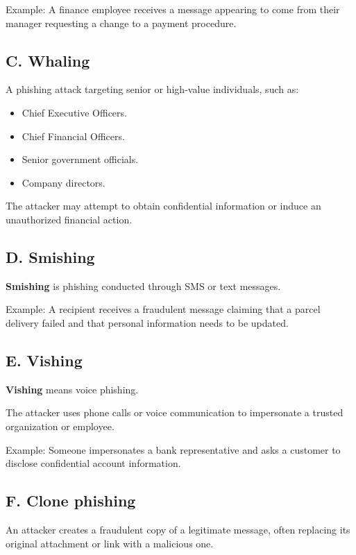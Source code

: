 Example: A finance employee receives a message appearing to come from their manager requesting a change to a payment procedure.

\subsection{C. Whaling}

A phishing attack targeting senior or high-value individuals, such as:

\begin{itemize}
\item Chief Executive Officers.
\item Chief Financial Officers.
\item Senior government officials.
\item Company directors.
\end{itemize}

The attacker may attempt to obtain confidential information or induce an unauthorized financial action.

\subsection{D. Smishing}

\textbf{Smishing} is phishing conducted through SMS or text messages.

Example: A recipient receives a fraudulent message claiming that a parcel delivery failed and that personal information needs to be updated.

\subsection{E. Vishing}

\textbf{Vishing} means voice phishing.

The attacker uses phone calls or voice communication to impersonate a trusted organization or employee.

Example: Someone impersonates a bank representative and asks a customer to disclose confidential account information.

\subsection{F. Clone phishing}

An attacker creates a fraudulent copy of a legitimate message, often replacing its original attachment or link with a malicious one.


